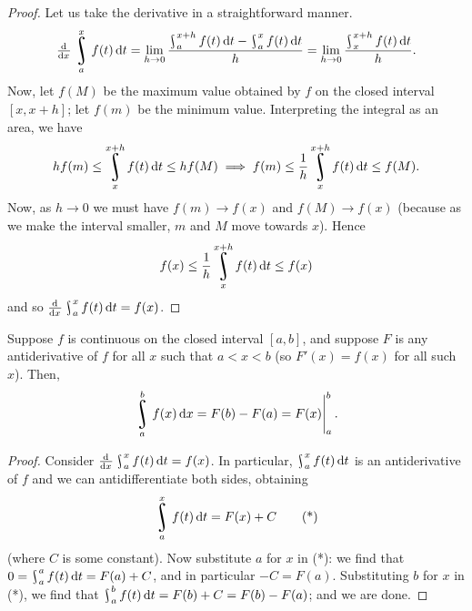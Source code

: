 \begin{proof}
  Let us take the derivative in a straightforward manner.
  \begin{displaymath}
    \od{}{x} \rint^x_a f(t) \dif{t} = \lim_{h \to 0} \frac{\rint^{x + h}_a f(t) \dif{t} - \rint^{x}_a f(t) \dif{t}}{h}
                                    = \lim_{h \to 0} \frac{\rint^{x + h}_x f(t) \dif{t}}{h}.
  \end{displaymath}
  Now, let $ f(M) $ be the maximum value obtained by $ f $ on the closed interval $ [x,x+h] $; let $ f(m) $ be the minimum value. Interpreting the integral as
  an area, we have
  \begin{displaymath}
    hf(m) \leq \rint^{x + h}_x f(t) \dif{t} \leq hf(M) \implies f(m) \leq \frac{1}{h} \rint^{x + h}_x f(t) \dif{t} \leq f(M).
  \end{displaymath}
  Now, as $ h \to 0 $ we must have $ f(m) \to f(x) $ and $ f(M) \to f(x) $ (because as we make the interval smaller, $ m $ and $ M $ move towards $ x $). Hence
  \begin{displaymath}
    f(x) \leq \frac{1}{h} \rint^{x + h}_x f(t) \dif{t} \leq f(x)
  \end{displaymath}
  and so $ \od{}{x} \rint^x_a f(t) \dif{t} = f(x) $.
\end{proof}

\begin{thm}[FTC1]
  Suppose $ f $ is continuous on the closed interval $ [a,b] $, and suppose $ F $ is any antiderivative of $ f $ for all $ x $ such
  that $ a < x < b $ (so $ F'(x) = f(x) $ for all such $ x $). Then,
  \begin{displaymath}
    \rint^b_a f(x) \dif{x} = F(b) - F(a) = \eval{F(x)}_a^b.
  \end{displaymath}
\end{thm}

\begin{proof}
  Consider $ \od{}{x} \rint^x_a f(t) \dif{t} = f(x) $. In particular, $ \rint^x_a f(t) \dif{t} $ is an antiderivative of $ f $ and we can antidifferentiate both
  sides, obtaining
  \begin{equation}\label{eqn:ftc1}
    \rint^x_a f(t) \dif{t} = F(x) + C \tag{*}
  \end{equation}
  (where $ C $ is some constant). Now substitute $ a $ for $ x $ in (*): we find that $ 0 = \rint^a_a f(t) \dif{t} = F(a) + C $, and in particular $ -C = F(a) $.
  Substituting $ b $ for $ x $ in (*), we find that $ \rint^b_a f(t) \dif{t} = F(b) + C = F(b) - F(a) $; and we are done.
\end{proof}

